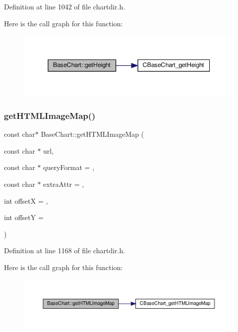 Definition at line 1042 of file chartdir.\+h.

Here is the call graph for this function\+:
\nopagebreak
\begin{figure}[H]
\begin{center}
\leavevmode
\includegraphics[width=345pt]{class_base_chart_a2f337248bcc2c96d9d9b740d1b5752ee_cgraph}
\end{center}
\end{figure}
\mbox{\label{class_base_chart_af56d91a779cc7d6fd5c51c85dc58253c}} 
\subsubsection{\texorpdfstring{get\+H\+T\+M\+L\+Image\+Map()}{getHTMLImageMap()}}
{\footnotesize\ttfamily const char$\ast$ Base\+Chart\+::get\+H\+T\+M\+L\+Image\+Map (\begin{DoxyParamCaption}\item[{const char $\ast$}]{url,  }\item[{const char $\ast$}]{query\+Format = {},  }\item[{const char $\ast$}]{extra\+Attr = {},  }\item[{int}]{offsetX = {},  }\item[{int}]{offsetY = {} }\end{DoxyParamCaption})\hspace{0.3cm}{\ttfamily [inline]}}



Definition at line 1168 of file chartdir.\+h.

Here is the call graph for this function\+:
\nopagebreak
\begin{figure}[H]
\begin{center}
\leavevmode
\includegraphics[width=350pt]{class_base_chart_af56d91a779cc7d6fd5c51c85dc58253c_cgraph}
\end{center}
\end{figure}
\mbox{\label{class_base_chart_a5d69ddcea93f12d2a63fbc7d5b640911}} 
